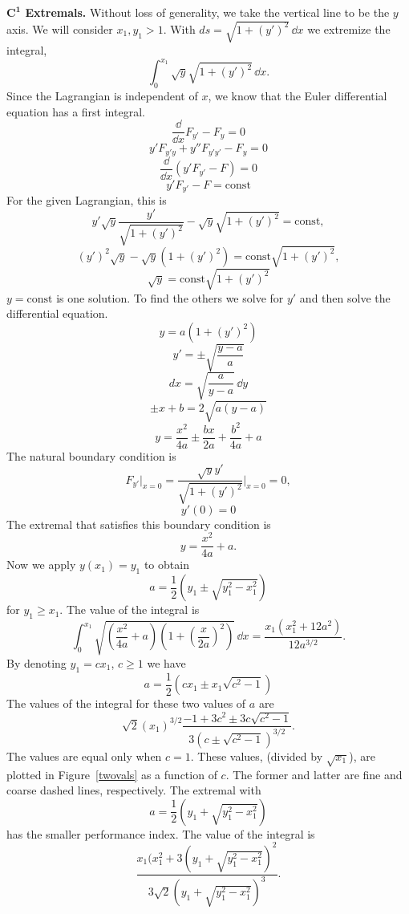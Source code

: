 \begin{Solution}
  \textbf{$\mathbf{C^1}$ Extremals.}
  Without loss of generality, we take the vertical line to be the $y$ axis.
  We will consider $x_1,y_1 > 1$.
  With $d s = \sqrt{1 + (y')^2} \,\dd x$ we extremize the integral,
  \[
  \int_0^{x_1} \sqrt{y} \sqrt{1 + (y')^2} \,\dd x.
  \]
  Since the Lagrangian is independent of $x$, we know that the Euler 
  differential equation has a first integral.
  \[
  \frac{\dd}{\dd x} F_{y'} - F_y = 0
  \]
  \[
  y' F_{y' y} + y'' F_{y' y'} - F_y = 0
  \]
  \[
  \frac{\dd}{\dd x} ( y' F_{y'} - F ) = 0
  \]
  \[
  y' F_{y'} - F = \mathrm{const}
  \]
  For the given Lagrangian, this is
  \[
  y' \sqrt{y} \frac{y'}{\sqrt{1 + (y')^2}} - \sqrt{y} \sqrt{1 + (y')^2} 
  = \mathrm{const},
  \]
  \[
  (y')^2 \sqrt{y} - \sqrt{y} (1 + (y')^2) 
  = \mathrm{const} \sqrt{1 + (y')^2},
  \]
  \[
  \sqrt{y} = \mathrm{const} \sqrt{ 1 + (y')^2 }
  \]
  $y = \mathrm{const}$ is one solution.  To find the others we solve for $y'$ and
  then solve the differential equation.
  \[
  y = a (1 + (y')^2)
  \]
  \[
  y' = \pm \sqrt{\frac{y-a}{a}}
  \]
  \[
  d x = \sqrt{\frac{a}{y-a}} \,\dd y
  \]
  \[
  \pm x + b = 2 \sqrt{a(y-a)}
  \]
  \[
  y = \frac{x^2}{4a} \pm \frac{b x}{2 a} + \frac{b^2}{4a} + a
  \]
  The natural boundary condition is 
  \[
  F_{y'} \big|_{x = 0} 
  = \frac{ \sqrt{y} y' }{ \sqrt{ 1 + (y')^2 } } \bigg|_{x = 0} = 0,
  \]
  \[
  y'(0) = 0
  \]
  The extremal that satisfies this boundary condition is
  \[
  y = \frac{x^2}{4a} + a.
  \]
  Now we apply $y(x_1) = y_1$ to obtain
  \[
  a = \frac{1}{2} \left( y_1 \pm \sqrt{y_1^2 - x_1^2} \right)
  \]
  for $y_1 \geq x_1$.  
  The value of the integral is
  \[
  \int_0^{x_1} \sqrt{\left( \frac{x^2}{4 a} + a \right) \left( 1 + 
      \left( \frac{x}{2a} \right)^2 \right) } \,\dd x
  = \frac{x_1 ( x_1^2 + 12 a^2)}{12 a^{3/2}}.
  \]
  By denoting $y_1 = c x_1$, $c \geq 1$ we have
  \[
  a = \frac{1}{2} \left( c x_1 \pm x_1 \sqrt{c^2 - 1} \right)
  \]
  The values of the integral for these two values of $a$ are
  \[
  \sqrt{2} (x_1)^{3/2} \frac{ -1 + 3 c^2 \pm 3 c \sqrt{c^2 - 1} }
  { 3 (c \pm \sqrt{c^2 - 1} )^{3/2} }.
  \]
  The values are equal only when $c = 1$.  These values, 
  (divided by $\sqrt{x_1}$), are plotted in Figure~\ref{twovals} as a function
  of $c$.  The former and latter are fine and coarse dashed lines, respectively.
  The extremal with
  \[
  a = \frac{1}{2} \left( y_1 + \sqrt{y_1^2 - x_1^2} \right)
  \]
  has the smaller performance index.  The value of the integral is 
  \[
  \frac{ x_1 (x_1^2 + 3( y_1 + \sqrt{y_1^2 - x_1^2} )^2 }
  { 3 \sqrt{2} ( y_1 + \sqrt{ y_1^2 - x_1^2} )^3 }.
  \]


\end{Solution}
